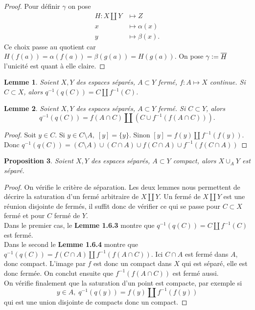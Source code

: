 \documentclass[12pt]{book}
\newcommand{\defeq}{\vcentcolon=}
\newtheorem{lemma}{Lemme}[section]
\newtheorem{prop}[lemma]{Proposition}
\theoremstyle{definition}
\theoremstyle{remark}
\begin{document}
	\begin{proof}
		Pour définir $\gamma$ on pose  
		\begin{align*}
			H : X \coprod Y &\longmapsto Z \\
			x &\longmapsto \alpha(x) \\
			y &\longmapsto \beta(x)
		.\end{align*}
		Ce choix passe au quotient car $H(f(a)) = \alpha(f(a)) = \beta(g(a)) = H(g(a))$. On pose  $\gamma \defeq \overline{H}$ l'unicité est quant à elle claire.
	\end{proof}
	
	\begin{lemma}
		Soient $X,Y$ des espaces séparés, $A\subset Y$ fermé, $f : A \longmapsto X$ continue. Si $C \subset X$, alors $q^{-1}(q(C)) = C \amalg f^{-1}(C)$. 
	\end{lemma}
	\begin{lemma}
		Soient $X,Y$ des espaces séparés,  $A\subset Y$ fermé. Si $C \subset Y$, alors \[q^{-1}(q(C)) = f(A\cap C) \amalg (C \cup f^{-1}(f(A\cap C))).\]
	\end{lemma}
	\begin{proof}
		Soit $y \in C$. Si $y\in C \setminus A, \; [y] = \{y\}$. Sinon $[y] = f(y) \amalg f^{-1}(f(y))$. Donc $q^{-1}(q(C)) = (C\setminus A) \cup (C \cap A) \cup f(C\cap A) \cup f^{-1}(f(C\cap A))$ 	
	\end{proof}
	\begin{prop}
		Soient $X,Y$ des espaces séparés,  $A\subset Y$ compact, alors $X \cup_A Y$ est séparé.
	\end{prop}
	\begin{proof}
		On vérifie le critère de séparation. Les deux lemmes nous permettent de décrire la saturation d'un fermé arbitraire de $X \coprod Y$. Un fermé de  $X \coprod Y$ est une réunion disjointe de fermés, il suffit donc de vérifier ce qui se passe pour $C \subset X$ fermé et pour $C$ fermé de  $Y$.\\ 
		Dans le premier cas, le \textbf{Lemme 1.6.3} montre que $q^{-1}(q(C)) = C \amalg f^{-1}(C)$ est fermé. \\
		Dans le second le \textbf{Lemme 1.6.4} montre que $q^{-1}(q(C)) =f(C\cap A) \amalg f^{-1}(f(A\cap C))$. Ici $C\cap A$ est fermé dans $A$, donc compact. L'image par $f$ est donc un compact dans $X$ qui est séparé, elle est donc fermée. On conclut ensuite que $f^{-1}(f(A\cap C))$ est fermé aussi. \\ 
	On vérifie finalement que la saturation d'un point est compacte, par exemple si \[y \in A, \; q^{-1}(q(y)) = f(y) \amalg f^{-1}(f(y))\] qui est une union disjointe de compacts donc un compact.
	\end{proof}
	
\end{document}
